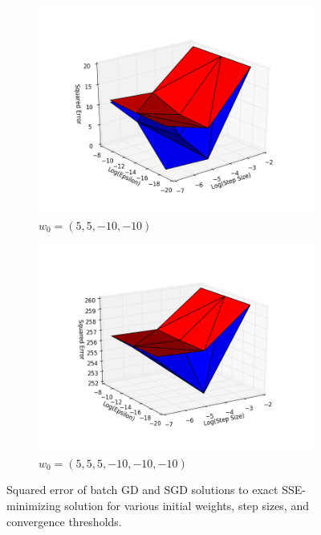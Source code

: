 \documentclass[10pt,psamsfonts]{amsart}
\theoremstyle{definition}
\theoremstyle{remark}
\numberwithin{equation}{section}
\begin{document}
\begin{figure}
\begin{subfigure}[b]{0.24\textwidth}
		\includegraphics[width=\textwidth]{hw1_2-3_3.png}
		\caption{$w_0 = (5,5,-10,-10)$}
	\end{subfigure}
		\begin{subfigure}[b]{0.24\textwidth}
			\includegraphics[width=\textwidth]{hw1_2-3_5.png}
			\caption{$w_0 = (5,5,5,-10,-10,-10)$}
		\end{subfigure}
	\caption{Squared error of batch GD and SGD solutions to exact SSE-minimizing solution for various initial weights, step sizes, and convergence thresholds.}
\end{figure}
\end{document}
